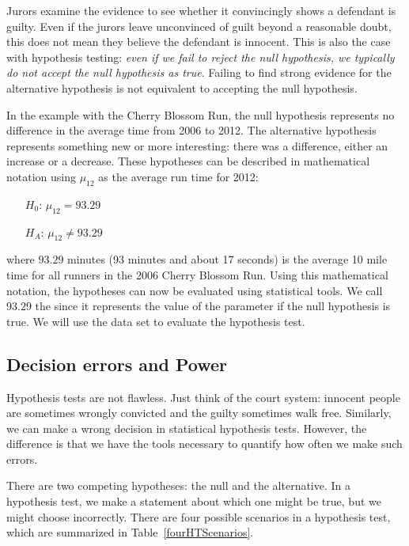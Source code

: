Jurors examine the evidence to see whether it convincingly shows a defendant is guilty. Even if the jurors leave unconvinced of guilt beyond a reasonable doubt, this does not mean they believe the defendant is innocent. This is also the case with hypothesis testing: \emph{even if we fail to reject the null hypothesis, we typically do not accept the null hypothesis as true}. Failing to find strong evidence for the alternative hypothesis is not equivalent to accepting the null hypothesis.

In the example with the Cherry Blossom Run, the null hypothesis represents no difference in the average time from 2006 to 2012. The alternative hypothesis represents something new or more interesting: there was a difference, either an increase or a decrease. These hypotheses can be described in mathematical notation using $\mu_{12}$ as the average run time for 2012:
\begin{itemize}
\setlength{\itemsep}{0mm}
\item[$H_0$:] $\mu_{12} = 93.29$ %
\item[$H_A$:] $\mu_{12} \neq 93.29$
\end{itemize}
where $93.29$ minutes (93 minutes and about 17 seconds) is the average 10 mile time for all runners in the 2006 Cherry Blossom Run. Using this mathematical notation, the hypotheses can now be evaluated using statistical tools. We call 93.29 the  since it represents the value of the parameter if the null hypothesis is true. We will use the  data set to evaluate the hypothesis test.

\subsection{Decision errors and Power}

Hypothesis tests are not flawless. Just think of the court system: innocent people are sometimes wrongly convicted and the guilty sometimes walk free. Similarly, we can make a wrong decision in statistical hypothesis tests. However, the difference is that we have the tools necessary to quantify how often we make such errors.

There are two competing hypotheses: the null and the alternative. In a hypothesis test, we make a statement about which one might be true, but we might choose incorrectly. There are four possible scenarios in a hypothesis test, which are summarized in Table~\ref{fourHTScenarios}.

